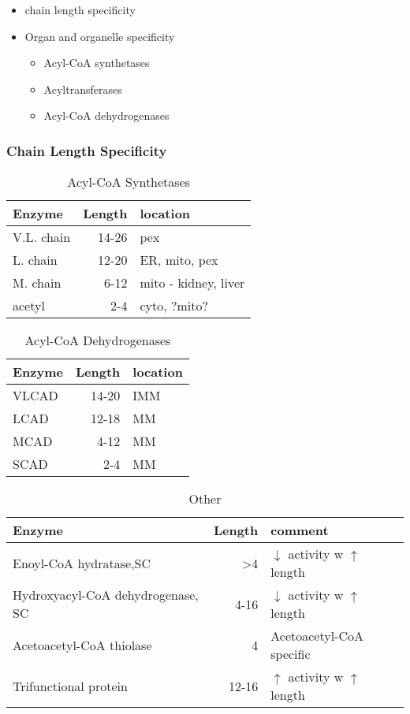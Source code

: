 \documentclass{scrartcl}
\begin{document}
\begin{itemize}
\item chain length specificity
\item Organ and organelle specificity
\begin{itemize}
\item Acyl-CoA synthetases
\item Acyltransferases
\item Acyl-CoA dehydrogenases
\end{itemize}
\end{itemize}


\subsubsection{Chain Length Specificity}
\label{sec:orgaf60a4e}

\begin{table}[htbp]
\caption{\label{tab:orge04766c}
Acyl-CoA Synthetases}
\centering
\begin{tabular}{lrl}
Enzyme & Length & location\\
\hline
V.L. chain & 14-26 & pex\\
L. chain & 12-20 & ER, mito, pex\\
M. chain & 6-12 & mito - kidney, liver\\
acetyl & 2-4 & cyto, ?mito?\\
\end{tabular}
\end{table}


\begin{table}[htbp]
\caption{\label{tab:org33b229f}
Acyl-CoA Dehydrogenases}
\centering
\begin{tabular}{lrl}
Enzyme & Length & location\\
\hline
VLCAD & 14-20 & IMM\\
LCAD & 12-18 & MM\\
MCAD & 4-12 & MM\\
SCAD & 2-4 & MM\\
\end{tabular}
\end{table}


\begin{table}[htbp]
\caption{\label{tab:org1506360}
Other}
\centering
\begin{tabular}{lrl}
Enzyme & Length & comment\\
\hline
Enoyl-CoA hydratase,SC & >4 & \(\downarrow\) activity w \(\uparrow\) length\\
Hydroxyacyl-CoA dehydrogenase, SC & 4-16 & \(\downarrow\) activity w \(\uparrow\) length\\
Acetoacetyl-CoA thiolase & 4 & Acetoacetyl-CoA specific\\
Trifunctional protein & 12-16 & \(\uparrow\) activity w \(\uparrow\) length\\
\end{tabular}
\end{table}
\end{document}
